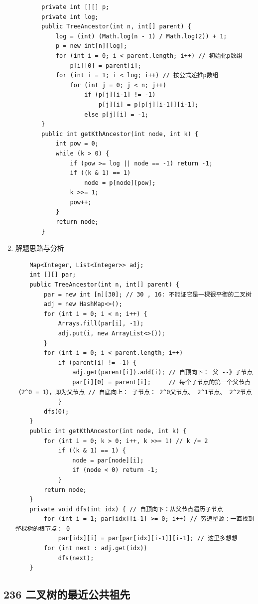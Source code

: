 \documentclass[9pt, b5paaper]{book}
\begin{document}
\begin{enumerate}
\begin{itemize}
\begin{verbatim}
    private int [][] p;
    private int log;
    public TreeAncestor(int n, int[] parent) {
        log = (int) (Math.log(n - 1) / Math.log(2)) + 1;
        p = new int[n][log];
        for (int i = 0; i < parent.length; i++) // 初始化p数组
            p[i][0] = parent[i];
        for (int i = 1; i < log; i++) // 按公式递推p数组
            for (int j = 0; j < n; j++) 
                if (p[j][i-1] != -1) 
                    p[j][i] = p[p[j][i-1]][i-1];
                else p[j][i] = -1;
    }
    public int getKthAncestor(int node, int k) {
        int pow = 0;
        while (k > 0) {
            if (pow >= log || node == -1) return -1;
            if ((k & 1) == 1) 
                node = p[node][pow];
            k >>= 1;
            pow++;
        }
        return node;
    }
\end{verbatim}
\end{itemize}
\item 解题思路与分析
\label{sec-1-0-6-2}
\begin{verbatim}
    Map<Integer, List<Integer>> adj;
    int [][] par;
    public TreeAncestor(int n, int[] parent) {
        par = new int [n][30]; // 30 , 16: 不能证它是一棵很平衡的二叉树
        adj = new HashMap<>();
        for (int i = 0; i < n; i++) {
            Arrays.fill(par[i], -1);
            adj.put(i, new ArrayList<>());
        }
        for (int i = 0; i < parent.length; i++) 
            if (parent[i] != -1) {
                adj.get(parent[i]).add(i); // 自顶向下： 父 --》子节点
                par[i][0] = parent[i];     // 每个子节点的第一个父节点（2^0 = 1），即为父节点 // 自底向上： 子节点： 2^0父节点、 2^1节点、 2^2节点
            }
        dfs(0);
    }
    public int getKthAncestor(int node, int k) {
        for (int i = 0; k > 0; i++, k >>= 1) // k /= 2
            if ((k & 1) == 1) {
                node = par[node][i];
                if (node < 0) return -1;
            }
        return node;
    }
    private void dfs(int idx) { // 自顶向下：从父节点遍历子节点
        for (int i = 1; par[idx][i-1] >= 0; i++) // 穷追塑源：一直找到整棵树的根节点： 0
            par[idx][i] = par[par[idx][i-1]][i-1]; // 这里多想想
        for (int next : adj.get(idx)) 
            dfs(next);
    }
\end{verbatim}
\end{enumerate}
\subsection{236 二叉树的最近公共祖先}
\label{sec-1-0-7}
\end{document}

